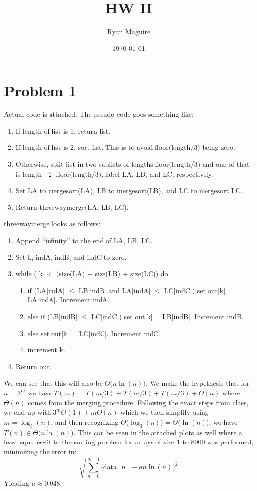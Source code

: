 \documentclass{article}
\title{HW II}
\author{Ryan Maguire}
\date{\today}
\begin{document}
    \maketitle
    \section*{Problem 1}
        Actual code is attached. The pseudo-code goes something like:
        \begin{enumerate}
            \item If length of list is 1, return list.
            \item If length of list is 2, sort list. This is to avoid floor(length/3) being zero.
            \item Otherwise, split list in two sublists of lengths floor(length/3) and one of that is
                  length - $2\cdot\text{floor(length/3)}$, label LA, LB, and LC, respectively.
            \item Set LA to mergesort(LA), LB to mergesort(LB), and LC to mergesort LC.
            \item Return threewaymerge(LA, LB, LC).
        \end{enumerate}
        threewaymerge looks as follows:
        \begin{enumerate}
            \item Append ``infinity'' to the end of LA, LB, LC.
            \item Set k, indA, indB, and indC to zero.
            \item while ( k $<$ (size(LA) + size(LB) + size(LC)) do 
            \begin{enumerate}
                \item if (LA[indA] $\leq$ LB[indB] and LA[indA] $\leq$ LC[indC]) set out[k] = LA[indA]. Increment indA.
                \item else if (LB[indB] $\leq$ LC[indC]) set out[k] = LB[indB]. Increment indB.
                \item else set out[k] = LC[indC]. Increment indC.
                \item increment k.
            \end{enumerate}
            \item Return out.
        \end{enumerate}
        We can see that this will also be $O\big(n\ln(n)\big)$. We make the hypothesis that for $n=3^{m}$ we have
        $T(m)=T(m/3)+T(m/3)+T(m/3)+\Theta(n)$ where $\Theta(n)$ comes from the merging procedure. Following the
        exact steps from class, we end up with $3^{m}\Theta(1)+m\Theta(n)$ which we then simplify using $m=\log_{3}(n)$,
        and then recognizing $\Theta\big(\log_{3}(n)\big)=\Theta\big(\ln(n)\big)$, we have
        $T(n)\in\Theta\big(n\ln(n)\big)$. This can be seen in the attached plots as well where a least squares-fit to the
        sorting problem for arrays of size 1 to 8000 was performed, minimizing the error in:
        \begin{equation}
            \sqrt{\sum_{n=0}^{N-1}\Big(\text{data}[n]-an\ln(n)\Big)^2}
        \end{equation}
        Yielding $a\approx{0.048}$.
\end{document}
